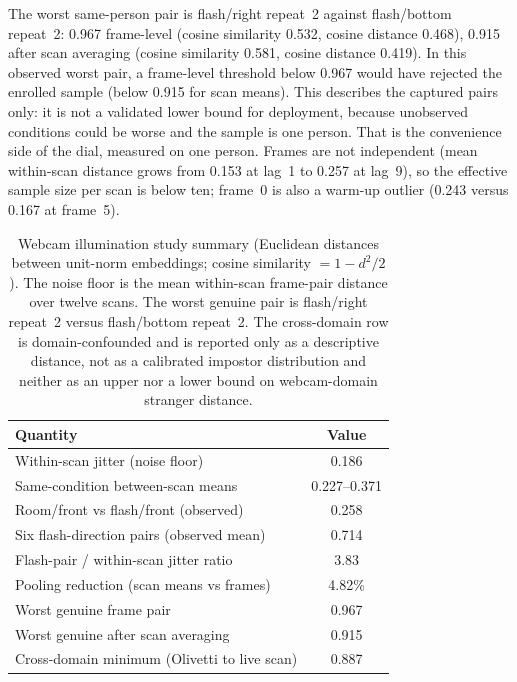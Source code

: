The worst same-person pair is flash/right repeat~2 against flash/bottom repeat~2: 0.967 frame-level (cosine similarity 0.532, cosine distance 0.468), 0.915 after scan averaging (cosine similarity 0.581, cosine distance 0.419). In this observed worst pair, a frame-level threshold below 0.967 would have rejected the enrolled sample (below 0.915 for scan means). This describes the captured pairs only: it is not a validated lower bound for deployment, because unobserved conditions could be worse and the sample is one person. That is the convenience side of the dial, measured on one person. Frames are not independent (mean within-scan distance grows from 0.153 at lag~1 to 0.257 at lag~9), so the effective sample size per scan is below ten; frame~0 is also a warm-up outlier (0.243 versus 0.167 at frame~5).

\begin{table}[t]
\centering
\caption{Webcam illumination study summary (Euclidean distances between unit-norm embeddings; cosine similarity $=1-d^2/2$). The noise floor is the mean within-scan frame-pair distance over twelve scans. The worst genuine pair is flash/right repeat~2 versus flash/bottom repeat~2. The cross-domain row is domain-confounded and is reported only as a descriptive distance, not as a calibrated impostor distribution and neither as an upper nor a lower bound on webcam-domain stranger distance.}
\label{tab:lighting}
\footnotesize
\begin{tabular}{@{}lc@{}}
\toprule
Quantity & Value \\
\midrule
Within-scan jitter (noise floor) & 0.186 \\
Same-condition between-scan means & 0.227--0.371 \\
Room/front vs flash/front (observed) & 0.258 \\
Six flash-direction pairs (observed mean) & 0.714 \\
Flash-pair / within-scan jitter ratio & 3.83 \\
Pooling reduction (scan means vs frames) & 4.82\% \\
Worst genuine frame pair & 0.967 \\
Worst genuine after scan averaging & 0.915 \\
Cross-domain minimum (Olivetti to live scan) & 0.887 \\
\bottomrule
\end{tabular}
\end{table}

